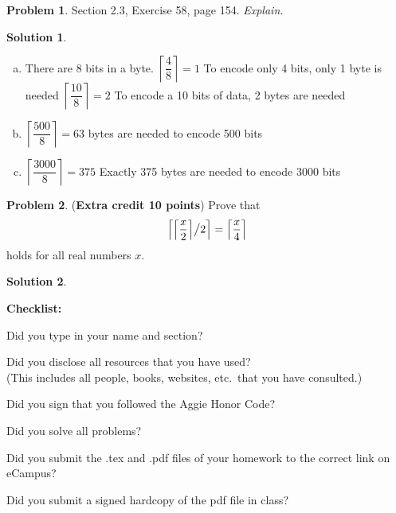 \documentclass{article}
\theoremstyle{definition}
\newtheorem{problem}{Problem}
\newtheorem*{solution}{Solution}
\newcommand{\checklist}{\noindent\textbf{Checklist:}
\begin{compactitem}[$\Box$] 
\item Did you type in your name and section? 
\item Did you disclose all resources that you have used? \\
(This includes all people, books, websites, etc.\ that you have consulted.)
\item Did you sign that you followed the Aggie Honor Code? 
\item Did you solve all problems? 
\item Did you submit the .tex and .pdf files of your homework to the correct link on eCampus?
\item Did you submit a signed hardcopy of the pdf file in class? 
\end{compactitem}
}
\begin{document}
\begin{problem} Section 2.3, Exercise 58, page 154. \textsl{Explain.}
\end{problem}
\begin{solution}
\begin{enumerate}[a)]
  \item There are 8 bits in a byte. $\left \lceil \dfrac{4}{8} \right \rceil = 1$ To encode only 4 bits, only 1 byte is needed
  $\left \lceil \dfrac{10}{8} \right \rceil = 2$ To encode a 10 bits of data, 2 bytes are needed
  \item $\left \lceil \dfrac{500}{8} \right \rceil =  63$ bytes are needed to encode 500 bits
  \item $\left \lceil \dfrac{3000}{8} \right \rceil = 375$ Exactly 375 bytes are needed to encode 3000 bits
\end{enumerate}
\end{solution}

\begin{problem} (\textbf{Extra credit 10 points}) Prove that 
$$ \left\lceil {\left\lceil \displaystyle\frac{x}{2} \right\rceil} \big{/} {2} \right\rceil = 
\left\lceil \displaystyle\frac{x}{4} \right\rceil$$ holds for all real numbers $x$.
\end{problem}
\begin{solution}
\end{solution}

\goodbreak
\checklist
\end{document}
